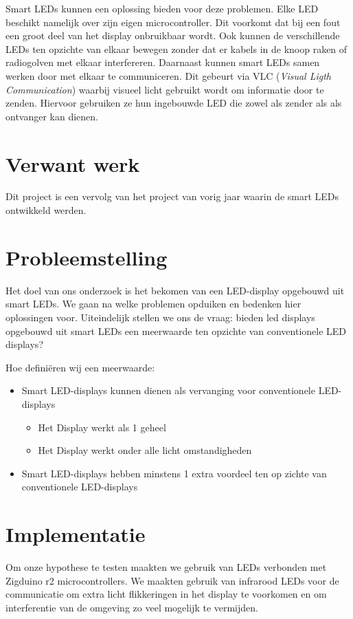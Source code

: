 \documentclass{article}
\begin{document}
Smart LEDs kunnen een oplossing bieden voor deze problemen. Elke LED beschikt namelijk over zijn eigen microcontroller. Dit voorkomt dat bij een fout een groot deel van het display onbruikbaar wordt. Ook kunnen de verschillende LEDs ten opzichte van elkaar bewegen zonder dat er kabels in de knoop raken of radiogolven met elkaar interfereren. Daarnaast kunnen smart LEDs samen werken door met elkaar te communiceren. Dit gebeurt via VLC (\textit{Visual Ligth Communication}) waarbij visueel licht gebruikt wordt om informatie door te zenden\cite{VLC}. Hiervoor gebruiken ze hun ingebouwde LED die zowel als zender als als ontvanger kan dienen. 


\section{Verwant werk}
Dit project is een vervolg van het project van vorig jaar waarin de smart LEDs ontwikkeld werden. 


\section{Probleemstelling}

Het doel van ons onderzoek is het bekomen van een LED-display opgebouwd uit smart LEDs. We gaan na welke problemen opduiken en bedenken hier oplossingen voor. Uiteindelijk stellen we ons de vraag: bieden led displays opgebouwd uit smart LEDs een meerwaarde ten opzichte van conventionele LED displays? 

\smallskip

Hoe definiëren wij een meerwaarde:
\begin{itemize}
\item Smart LED-displays kunnen dienen als vervanging voor conventionele LED-displays
\begin{itemize}
\item Het Display werkt als 1 geheel
\item Het Display werkt onder alle licht omstandigheden
\end{itemize}
\item Smart LED-displays hebben minstens 1 extra voordeel ten op zichte van conventionele LED-displays
\end{itemize}

\smallskip


\section{Implementatie}
Om onze hypothese te testen maakten we gebruik van LEDs verbonden met Zigduino r2 microcontrollers. We maakten gebruik van infrarood LEDs voor de communicatie om extra licht flikkeringen in het display te voorkomen en om interferentie van de omgeving zo veel mogelijk te vermijden.
\end{document}
